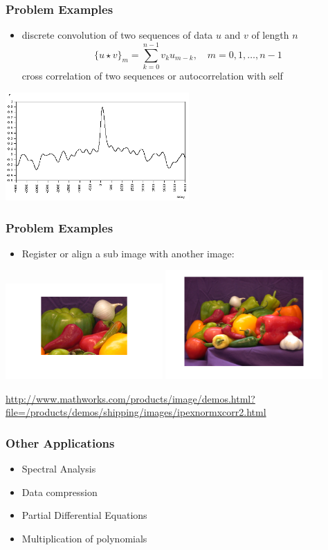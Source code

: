 \documentclass[10pt]{beamer}
\begin{document}
\begin{frame}
\frametitle{Problem Examples}
\begin{itemize}
  \item discrete convolution of two sequences of data $u$ and $v$ of length $n$
  \[
  \{u \star v\}_m = \sum_{k=0}^{n-1} v_k u_{m-k},\quad m = 0,1,\dots,n-1
  \]
  cross correlation of two sequences or autocorrelation with self
\end{itemize}
\begin{center}
  \includegraphics[width=7cm]{./figs/noisydata5}
\end{center}
\end{frame}

\begin{frame}
\frametitle{Problem Examples}
\begin{itemize}
  \item Register or align a sub image with another image:
\end{itemize}
\begin{center}
  \includegraphics[width=6cm]{./figs/image_corr2}
  \includegraphics[width=6cm]{./figs/image_corr1}
\end{center}
\url{http://www.mathworks.com/products/image/demos.html?file=/products/demos/shipping/images/ipexnormxcorr2.html}
\end{frame}
\begin{frame}
\frametitle{Other Applications}
\begin{itemize}
  \item Spectral Analysis
  \item Data compression
  \item Partial Differential Equations
  \item Multiplication of polynomials
\end{itemize}
\end{frame}
\end{document}
